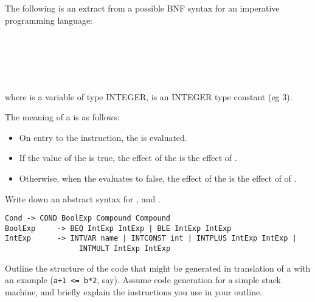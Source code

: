 \begin{questions}
\begin{subquestions}
\end{subquestions}


\question

\begin{subquestions}

\subquestion
The following is an extract from a possible BNF syntax for
an imperative programming language: 
\begin{bnf}
 \\
 \\
\\
\\
\end{bnf}
where  is a variable of type INTEGER, 
is an INTEGER type constant (eg 3).

The meaning of a  is as follows:
\begin{itemize}
\item On entry to the instruction, the  is 
        evaluated. 
\item If the value of the  is true, the effect of
        the  is the effect of .
\item Otherwise, when the  evaluates to false,
        the effect of the  is the effect of
        of .
\end{itemize}

\begin{subsubquestions}
\subsubquestion
Write down an abstract syntax for , 
 and .
\begin{modelanswer}
\begin{verbatim}
Cond -> COND BoolExp Compound Compound
BoolExp     -> BEQ IntExp IntExp | BLE IntExp IntExp
IntExp      -> INTVAR name | INTCONST int | INTPLUS IntExp IntExp |
                 INTMULT IntExp IntExp
\end{verbatim}
\end{modelanswer}
\subsubquestion
        Outline the structure of the
        code that might be generated in translation of
        a  with an example 
         (\verb"a+1 <= b*2", say). 
        Assume code generation for a simple
        stack machine, and briefly explain the
        instructions you use in your outline.


\end{subsubquestions}
\end{subquestions}
\end{questions}
